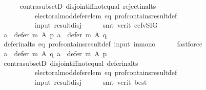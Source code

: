 \begin{isabellebody}
\ \ \ \ \isamarkupfalse%
\ contra{\isacharunderscore}{\kern0pt}subsetD\ disjoint{\isacharunderscore}{\kern0pt}iff{\isacharunderscore}{\kern0pt}not{\isacharunderscore}{\kern0pt}equal\ reject{\isacharunderscore}{\kern0pt}in{\isacharunderscore}{\kern0pt}alts\isanewline
\ \ \ \ \ \ \ \ \ \ electoral{\isacharunderscore}{\kern0pt}mod{\isacharunderscore}{\kern0pt}defer{\isacharunderscore}{\kern0pt}elem\ eq\ prof{\isacharunderscore}{\kern0pt}contains{\isacharunderscore}{\kern0pt}result{\isacharunderscore}{\kern0pt}def\isanewline
\ \ \ \ \ \ \ \ \ \ input\ result{\isacharunderscore}{\kern0pt}disj\isanewline
\ \ \ \ \isamarkupfalse%
\ {\isacharparenleft}{\kern0pt}smt\ {\isacharparenleft}{\kern0pt}verit{\isacharcomma}{\kern0pt}\ ccfv{\isacharunderscore}{\kern0pt}SIG{\isacharparenright}{\kern0pt}{\isacharparenright}{\kern0pt}\isanewline
\ \ \isamarkupfalse%
\ \isamarkupfalse%
\ {\isachardoublequoteopen}{\isasymforall}a\ {\isasymin}\ defer\ m\ A\ p{\isachardot}{\kern0pt}\ a\ {\isasymin}\ defer\ m\ A\ q{\isachardoublequoteclose}\isanewline
\ \ \ \ \isamarkupfalse%
\ defer{\isacharunderscore}{\kern0pt}in{\isacharunderscore}{\kern0pt}alts\ eq\ prof{\isacharunderscore}{\kern0pt}contains{\isacharunderscore}{\kern0pt}result{\isacharunderscore}{\kern0pt}def\ input\ in{\isacharunderscore}{\kern0pt}mono\isanewline
\ \ \ \ \isamarkupfalse%
\ fastforce\isanewline
\ \ \isamarkupfalse%
\ \isamarkupfalse%
\ {\isachardoublequoteopen}{\isasymforall}a\ {\isasymin}\ defer\ m\ A\ q{\isachardot}{\kern0pt}\ a\ {\isasymin}\ defer\ m\ A\ p{\isachardoublequoteclose}\isanewline
\ \ \ \ \isamarkupfalse%
\ contra{\isacharunderscore}{\kern0pt}subsetD\ disjoint{\isacharunderscore}{\kern0pt}iff{\isacharunderscore}{\kern0pt}not{\isacharunderscore}{\kern0pt}equal\ defer{\isacharunderscore}{\kern0pt}in{\isacharunderscore}{\kern0pt}alts\isanewline
\ \ \ \ \ \ \ \ \ \ electoral{\isacharunderscore}{\kern0pt}mod{\isacharunderscore}{\kern0pt}defer{\isacharunderscore}{\kern0pt}elem\ eq\ prof{\isacharunderscore}{\kern0pt}contains{\isacharunderscore}{\kern0pt}result{\isacharunderscore}{\kern0pt}def\isanewline
\ \ \ \ \ \ \ \ \ \ input\ result{\isacharunderscore}{\kern0pt}disj\isanewline
\ \ \ \ \isamarkupfalse%
\ {\isacharparenleft}{\kern0pt}smt\ {\isacharparenleft}{\kern0pt}verit{\isacharcomma}{\kern0pt}\ best{\isacharparenright}{\kern0pt}{\isacharparenright}{\kern0pt}\isanewline
\ \ \isamarkupfalse%
\ \isamarkupfalse%

\end{isabellebody}
